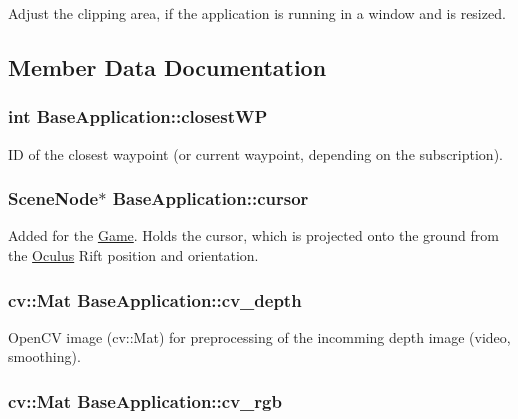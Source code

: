 \-Adjust the clipping area, if the application is running in a window and is resized. 

\subsection{\-Member \-Data \-Documentation}
\hypertarget{classBaseApplication_a5dcf0fddc75e2b46d35fd8b9ed592dc9}{
\subsubsection[{closest\-W\-P}]{\setlength{\rightskip}{0pt plus 5cm}int {\bf \-Base\-Application\-::closest\-W\-P}}}\label{classBaseApplication_a5dcf0fddc75e2b46d35fd8b9ed592dc9}
\-I\-D of the closest waypoint (or current waypoint, depending on the subscription). \hypertarget{classBaseApplication_af66eb984ef0ef903c272b79a852cce93}{
\subsubsection[{cursor}]{\setlength{\rightskip}{0pt plus 5cm}\-Scene\-Node$\ast$ {\bf \-Base\-Application\-::cursor}}}\label{classBaseApplication_af66eb984ef0ef903c272b79a852cce93}
\-Added for the \hyperlink{classGame}{\-Game}. \-Holds the cursor, which is projected onto the ground from the \hyperlink{classOculus}{\-Oculus} \-Rift position and orientation. \hypertarget{classBaseApplication_a48295806a980665f17d787215c5f90c6}{
\subsubsection[{cv\-\_\-depth}]{\setlength{\rightskip}{0pt plus 5cm}cv\-::\-Mat {\bf \-Base\-Application\-::cv\-\_\-depth}}}\label{classBaseApplication_a48295806a980665f17d787215c5f90c6}
\-Open\-C\-V image (cv\-::\-Mat) for preprocessing of the incomming depth image (video, smoothing). \hypertarget{classBaseApplication_ad21a1772f66fec18c20a2924ad943d1b}{
\subsubsection[{cv\-\_\-rgb}]{\setlength{\rightskip}{0pt plus 5cm}cv\-::\-Mat {\bf \-Base\-Application\-::cv\-\_\-rgb}}}\label{classBaseApplication_ad21a1772f66fec18c20a2924ad943d1b}
